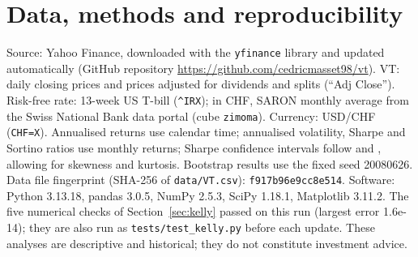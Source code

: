 \documentclass[11pt,a4paper]{article}
\newcommand{\note}[1]{{\footnotesize\color{muted}#1\par}}
\begin{document}
\section*{Data, methods and reproducibility}
\note{Source: Yahoo Finance, downloaded with the \texttt{yfinance} library and updated automatically (GitHub repository \url{https://github.com/cedricmasset98/vt}). VT: daily closing prices and prices adjusted for dividends and splits (``Adj Close''). Risk-free rate: 13-week US T-bill (\texttt{\^{}IRX}); in CHF, SARON monthly average from the Swiss National Bank data portal (cube \texttt{zimoma}). Currency: USD/CHF (\texttt{CHF=X}). Annualised returns use calendar time; annualised volatility, Sharpe and Sortino ratios use monthly returns; Sharpe confidence intervals follow \citet{mertens2002} and \citet{opdyke2007}, allowing for skewness and kurtosis. Bootstrap results use the fixed seed 20080626. Data file fingerprint (SHA-256 of \texttt{data/VT.csv}): \texttt{f917b96e9cc8e514}. Software: Python 3.13.18, pandas 3.0.5, NumPy 2.5.3, SciPy 1.18.1, Matplotlib 3.11.2. The five numerical checks of Section~\ref{sec:kelly} passed on this run (largest error 1.6e-14); they are also run as \texttt{tests/test\_kelly.py} before each update. These analyses are descriptive and historical; they do not constitute investment advice.}
\end{document}
